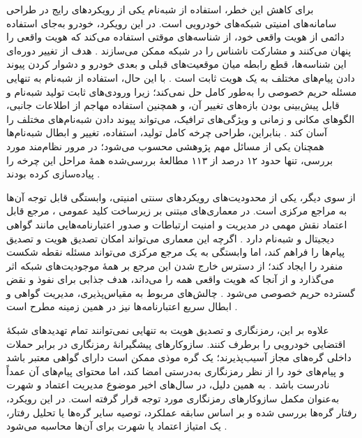 \documentclass[12pt,a4paper]{article}
\begin{document}
برای کاهش این خطر، استفاده از شبه‌نام  یکی از رویکرد‌های رایج در طراحی سامانه‌های امنیتی شبکه‌های خودرویی است. در این رویکرد، خودرو به‌جای استفاده دائمی از هویت واقعی خود، از شناسه‌های موقتی استفاده می‌کند که هویت واقعی را پنهان می‌کنند و مشارکت ناشناس را در شبکه ممکن می‌سازند \cite{rahmawatiagustinaSystematicLiteratureReview2025}. هدف از تغییر دوره‌ای این شناسه‌ها، قطع رابطه میان موقعیت‌های قبلی و بعدی خودرو و دشوار کردن پیوند دادن پیام‌های مختلف به یک هویت ثابت است \cite{luPseudonymChangingSocial2012}. با این حال، استفاده از شبه‌نام به تنهایی مسئله حریم خصوصی را به‌طور کامل حل نمی‌کند؛ زیرا ورودی‌های ثابت تولید شبه‌نام و قابل پیش‌بینی بودن بازه‌های تغییر آن، و همچنین استفاده مهاجم از اطلاعات جانبی، الگو‌های مکانی و زمانی و ویژگی‌های ترافیک، می‌تواند پیوند دادن شبه‌نام‌های مختلف را آسان کند \cite{rahmawatiagustinaSystematicLiteratureReview2025,luPseudonymChangingSocial2012}. بنابراین، طراحی چرخه کامل تولید، استفاده، تغییر و ابطال شبه‌نام‌ها همچنان یکی از مسائل مهم پژوهشی محسوب می‌شود؛ در مرور نظام‌مند مورد بررسی، تنها حدود ۱۲ درصد از ۱۱۳ مطالعهٔ بررسی‌شده همهٔ مراحل این چرخه را پیاده‌سازی کرده بودند \cite{rahmawatiagustinaSystematicLiteratureReview2025}.

از سوی دیگر، یکی از محدودیت‌های رویکرد‌های سنتی امنیتی، وابستگی قابل توجه آن‌ها به مراجع مرکزی است. در معماری‌های مبتنی بر زیرساخت کلید عمومی ، مرجع قابل اعتماد  نقش مهمی در مدیریت و امنیت ارتباطات و صدور اعتبارنامه‌هایی مانند گواهی دیجیتال و شبه‌نام دارد \cite{rahmawatiagustinaSystematicLiteratureReview2025}. اگرچه این معماری می‌تواند امکان تصدیق هویت و تصدیق پیام‌ها را فراهم کند، اما وابستگی به یک مرجع مرکزی می‌تواند مسئله نقطه شکست منفرد  را ایجاد کند؛ از دسترس خارج شدن این مرجع بر همهٔ موجودیت‌های شبکه اثر می‌گذارد و از آنجا که هویت واقعی همه را می‌داند، هدف جذابی برای نفوذ و نقض گسترده حریم خصوصی می‌شود \cite{rahmawatiagustinaSystematicLiteratureReview2025}. چالش‌های مربوط به مقیاس‌پذیری، مدیریت گواهی و ابطال سریع اعتبارنامه‌ها نیز در همین زمینه مطرح است \cite{farsimadanReviewSecurityChallenges2025,hozouriOverviewVANETVehicular2023}.

علاوه بر این، رمزنگاری و تصدیق هویت به تنهایی نمی‌توانند تمام تهدید‌های شبکهٔ اقتضایی خودرویی را برطرف کنند. سازوکار‌های پیشگیرانهٔ رمزنگاری در برابر حملات داخلی گره‌های مجاز آسیب‌پذیرند؛ یک گره موذی ممکن است دارای گواهی معتبر باشد و پیام‌های خود را از نظر رمزنگاری به‌درستی امضا کند، اما محتوای پیام‌های آن عمداً نادرست باشد \cite{farsimadanReviewSecurityChallenges2025}. به همین دلیل، در سال‌های اخیر موضوع مدیریت اعتماد و شهرت به‌عنوان مکمل سازوکار‌های رمزنگاری مورد توجه قرار گرفته است. در این رویکرد، رفتار گره‌ها بررسی شده و بر اساس سابقه عملکرد، توصیه سایر گره‌ها یا تحلیل رفتار، یک امتیاز اعتماد یا شهرت برای آن‌ها محاسبه می‌شود \cite{razaBlockchainBasedReputationTrust2024,ghovanlooyghajarSBTMSScalableBlockchain2021}.
\end{document}
